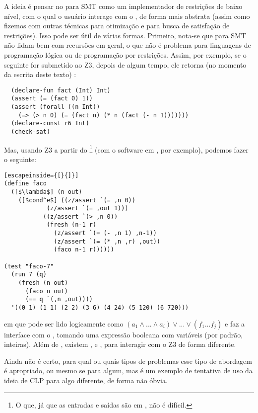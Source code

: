 \documentclass{article}
\begin{document}
A ideia é pensar no  para SMT como um implementador de
restrições de baixo nível, com o qual o usuário interage com o
, de forma mais abstrata (assim como fizemos com outras
técnicas para otimização e para busca de satisfação de
restrições). Isso pode ser útil de várias formas. Primeiro, nota-se
que  para SMT não lidam bem com recursões em geral, o que
não é problema para linguagens de programação lógica ou de programação
por restrições. Assim, por exemplo, se o seguinte for submetido ao Z3,
depois de algum tempo, ele retorna (no momento da escrita deste texto)
:

\begin{lstlisting}
  (declare-fun fact (Int) Int)
  (assert (= (fact 0) 1))
  (assert (forall ((n Int))
    (=> (> n 0) (= (fact n) (* n (fact (- n 1)))))))
  (declare-const r6 Int)
  (check-sat)
\end{lstlisting}

Mas, usando Z3 a partir do \footnote{O que, já que as
  entradas e saídas são em , não é difícil.} (com o
software em \cite{namin}, por exemplo), podemos fazer o seguinte:\\

\begin{lstlisting}[escapeinside={[}{]}]
(define faco
  ([$\lambda$] (n out)
    ([$cond^e$] ((z/assert `(= ,n 0))
            (z/assert `(= ,out 1)))
           ((z/assert `(> ,n 0))
            (fresh (n-1 r)
              (z/assert `(= (- ,n 1) ,n-1))
              (z/assert `(= (* ,n ,r) ,out))
              (faco n-1 r))))))

(test "faco-7"
  (run 7 (q)
    (fresh (n out)
      (faco n out)
      (== q `(,n ,out))))
  '((0 1) (1 1) (2 2) (3 6) (4 24) (5 120) (6 720)))

\end{lstlisting}

\noindent em que  pode ser lido logicamente como $(a_1 \wedge ... \wedge a_i) \vee
... \vee (f_1 ... f_j)$ e  faz a interface com o
, tomando uma expressão booleana com variáveis (por
padrão, inteiras). Além de , existem ,
 e , para interagir com o Z3 de forma
diferente.

Ainda não é certo, para qual ou quais tipos de problemas esse tipo de
abordagem é apropriado, ou mesmo se para algum, mas é um exemplo de
tentativa de uso da ideia de CLP para algo diferente, de forma não
óbvia.
           
\end{document}
